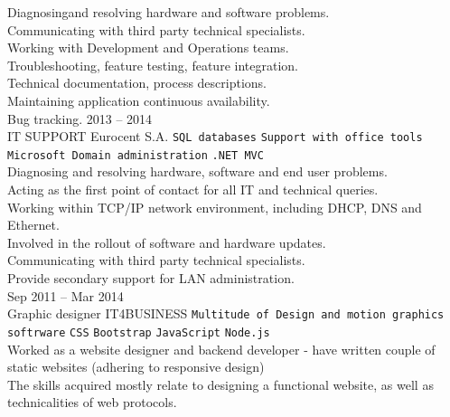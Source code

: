 \documentclass[9pt]{style/developercv}
\begin{document}
\begin{entrylist}
{			
			Diagnosingand resolving hardware and software problems. \\
			Communicating with third party technical specialists. \\
			Working with Development and Operations teams. \\
			Troubleshooting, feature testing, feature integration. \\
			Technical documentation, process descriptions. \\
			Maintaining application continuous availability. \\
			Bug tracking.
		}
	\entry
		{2013 -- 2014\\\footnotesize{IT SUPPORT}}
		{Eurocent S.A.}
		{
			\texttt{SQL databases}\slashsep
			\texttt{Support with office tools}\slashsep
			\texttt{Microsoft Domain administration}\slashsep
			\texttt{.NET MVC}\\

			Diagnosing and resolving hardware, software and end user problems. \\
			Acting as the first point of contact for all IT and technical queries. \\
			Working within TCP/IP network environment, including DHCP, DNS and Ethernet. \\
			Involved in the rollout of software and hardware updates. \\
			Communicating with third party technical specialists. \\
			Provide secondary support for LAN administration. \\
		}
	\entry
		{Sep 2011 -- Mar 2014\\\footnotesize{Graphic designer}}
		{IT4BUSINESS}
		{
			\texttt{Multitude of Design and motion graphics softrware}\slashsep
			\texttt{CSS}\slashsep
			\texttt{Bootstrap}\slashsep
			\texttt{JavaScript}\slashsep
			\texttt{Node.js}\\

			Worked as a website designer and backend developer - have written 
			couple of static websites (adhering to responsive design)\\
			The skills acquired mostly relate to designing a functional website, as 
			well as technicalities of web protocols.
		}
\end{entrylist}

\end{document}
